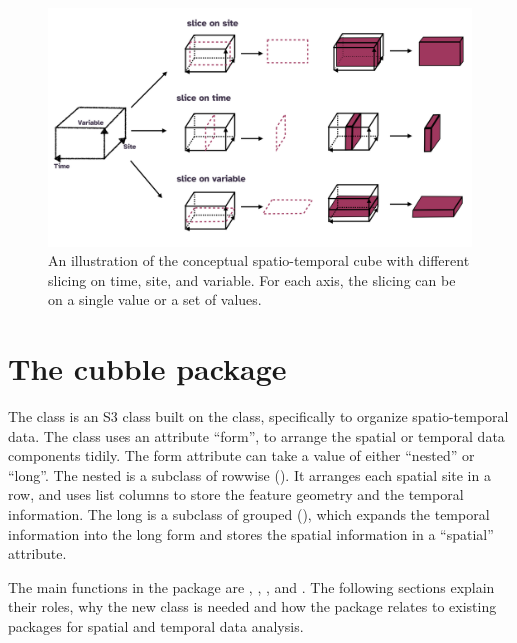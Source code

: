 \documentclass[
  shortnames]{jss}
\begin{document}
\begin{CodeChunk}
\begin{figure}

{\centering \includegraphics[width=1\linewidth]{../figures/diagram-keynotes/diagram-keynotes.001} 

}

\caption[An illustration of the conceptual spatio-temporal cube with different slicing on time, site, and variable]{An illustration of the conceptual spatio-temporal cube with different slicing on time, site, and variable. For each axis, the slicing can be on a single value or a set of values.}\label{fig:cube-def}
\end{figure}
\end{CodeChunk}

\hypertarget{cubble}{%
\section{The cubble package}\label{cubble}}

The  class is an S3 class \citep{advr} built on the  class, specifically to organize spatio-temporal data. The  class uses an attribute ``form'', to arrange the spatial or temporal data components tidily. The form attribute can take a value of either ``nested'' or ``long''. The nested  is a subclass of rowwise  (). It arranges each spatial site in a row, and uses list columns to store the feature geometry and the temporal information. The long  is a subclass of grouped  (), which expands the temporal information into the long form and stores the spatial information in a ``spatial'' attribute.

The main functions in the package are , , , and . The following sections explain their roles, why the new  class is needed and how the package relates to existing packages for spatial and temporal data analysis.
\end{document}

